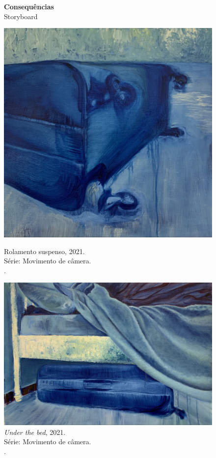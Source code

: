 \begin{figure}
  \caption[Consequências: Storyboard]{\textbf{Consequências} \\ Storyboard}
  \begin{minipage}{.35\linewidth}
    \includegraphics[width = \linewidth]{apendice/pinturas-finalizadas/boudet-rolamento-suspenso.pdf}
    \caption*{Rolamento suspenso, 2021. \\ Série: Movimento de câmera. \\ \oleolinho. \\ }
  \end{minipage}\hfill
  \begin{minipage}{.55\linewidth}
    \includegraphics[width = \linewidth]{apendice/pinturas-finalizadas/boudet-under-the-bed.pdf}
    \caption*{\emph{Under the bed}, 2021. \\ Série: Movimento de câmera. \\ \oleolinho. \\ }


\end{minipage}
\end{figure}
